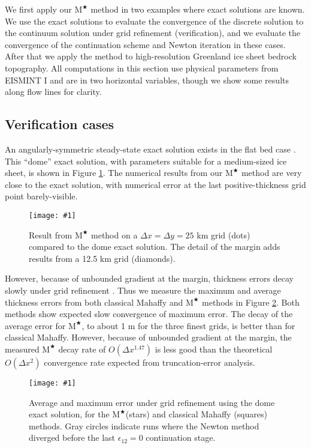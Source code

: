\documentclass[twocolumn,letterpaper]{igs}
\newcommand{\onecol}[1]{\texttt{[image: \#1]}}
\newcommand\eps{\epsilon}
\newcommand{\Mstar}{$\text{M}^{\bigstar}$\xspace}
\begin{document}
We first apply our \Mstar method in two examples where exact solutions are known.  We use the exact solutions to evaluate the convergence of the discrete solution to the continuum solution under grid refinement (verification), and we evaluate the convergence of the continuation scheme and Newton iteration in these cases.  After that we apply the method to high-resolution Greenland ice sheet bedrock topography.  All computations in this section use physical parameters from EISMINT I \citep{Huybrechtsetal1996} and are in two horizontal variables, though we show some results along flow lines for clarity.

\subsection{Verification cases}

An angularly-symmetric steady-state exact solution exists in the flat bed case \citep{Bueler2003,vanderVeen2013}.  This ``dome'' exact solution, with parameters suitable for a medium-sized ice sheet, is shown in Figure \ref{fig:domeprofile}.  The numerical results from our \Mstar method are very close to the exact solution, with numerical error at the last positive-thickness grid point barely-visible.

\begin{figure}[ht]
\onecol{domeprofile.pdf}
\caption{Result from \Mstar method on a $\Delta x=\Delta y=25$ km grid (dots) compared to the dome exact solution.  The detail of the margin adds results from a 12.5 km grid  (diamonds).}
\label{fig:domeprofile}
\end{figure}

However, because of unbounded gradient at the margin, thickness errors decay slowly under grid refinement \citep{Bueleretal2005}.  Thus we measure the maximum and average thickness errors from both classical Mahaffy and \Mstar methods in Figure \ref{fig:domeverif}.  Both methods show expected slow convergence of maximum error.  The decay of the average error for \Mstar, to about 1 m for the three finest grids, is better than for classical Mahaffy.  However, because of unbounded gradient at the margin, the measured \Mstar decay rate of $O(\Delta x^{1.47})$ is less good than the theoretical $O(\Delta x^2)$ convergence rate expected from truncation-error analysis.

\begin{figure}[ht]
\onecol{domeverif.pdf}
\caption{Average and maximum error under grid refinement using the dome exact solution, for the \Mstar (stars) and classical Mahaffy (squares) methods.  Gray circles indicate runs where the Newton method diverged before the last $\eps_{12}=0$ continuation stage.}
\label{fig:domeverif}
\end{figure}
\end{document}
